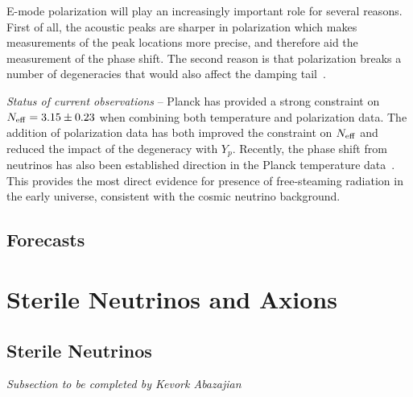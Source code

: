 E-mode polarization will play an increasingly important role for several reasons.  First of all, the acoustic peaks are sharper in polarization which makes measurements of the peak locations more precise, and therefore aid the measurement of the phase shift.  The second reason is that polarization breaks a number of degeneracies that would also affect the damping tail~\cite{Baumann:2015rya}.

{\it Status of current observations} -- Planck has provided a strong constraint on $N_{\rm eff} = 3.15 \pm 0.23$ when combining both temperature and polarization data.  The addition of polarization data has both improved the constraint on $N_{\rm eff}$ and reduced the impact of the degeneracy with $Y_p$.  Recently, the phase shift from neutrinos has also been established direction in the Planck temperature data~\cite{Follin:2015hya}.  This provides the most direct evidence for presence of free-steaming radiation in the early universe, consistent with the cosmic neutrino background.


\subsection{Forecasts}




\section{Sterile Neutrinos and Axions}
\subsection{Sterile Neutrinos}

{\it Subsection to be completed by Kevork Abazajian}

